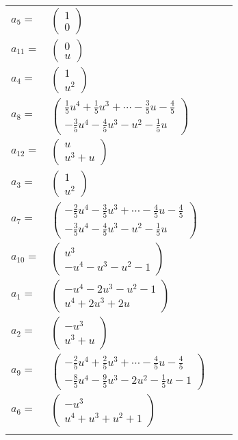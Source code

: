 \documentclass[1p]{elsarticle_modified}
\theoremstyle{definition}
\begin{document}
\begin{tabular}{m{7pt} m{180pt} m{7pt} m{180pt} }
\flushright $a_{5}=$&$\begin{pmatrix}1\\0\end{pmatrix}$ \\
\flushright $a_{11}=$&$\begin{pmatrix}0\\u\end{pmatrix}$ \\
\flushright $a_{4}=$&$\begin{pmatrix}1\\u^2\end{pmatrix}$ \\
\flushright $a_{8}=$&$\begin{pmatrix}\frac{1}{5} u^4+\frac{1}{5} u^3+\cdots-\frac{3}{5} u-\frac{4}{5}\\-\frac{3}{5} u^4-\frac{4}{5} u^3- u^2-\frac{1}{5} u\end{pmatrix}$ \\
\flushright $a_{12}=$&$\begin{pmatrix}u\\u^3+u\end{pmatrix}$ \\
\flushright $a_{3}=$&$\begin{pmatrix}1\\u^2\end{pmatrix}$ \\
\flushright $a_{7}=$&$\begin{pmatrix}-\frac{2}{5} u^4-\frac{3}{5} u^3+\cdots-\frac{4}{5} u-\frac{4}{5}\\-\frac{3}{5} u^4-\frac{4}{5} u^3- u^2-\frac{1}{5} u\end{pmatrix}$ \\
\flushright $a_{10}=$&$\begin{pmatrix}u^3\\- u^4- u^3- u^2-1\end{pmatrix}$ \\
\flushright $a_{1}=$&$\begin{pmatrix}- u^4-2 u^3- u^2-1\\u^4+2 u^3+2 u\end{pmatrix}$ \\
\flushright $a_{2}=$&$\begin{pmatrix}- u^3\\u^3+u\end{pmatrix}$ \\
\flushright $a_{9}=$&$\begin{pmatrix}-\frac{2}{5} u^4+\frac{2}{5} u^3+\cdots-\frac{4}{5} u-\frac{4}{5}\\-\frac{8}{5} u^4-\frac{9}{5} u^3-2 u^2-\frac{1}{5} u-1\end{pmatrix}$ \\
\flushright $a_{6}=$&$\begin{pmatrix}- u^3\\u^4+u^3+u^2+1\end{pmatrix}$\\&\end{tabular}
\end{document}
